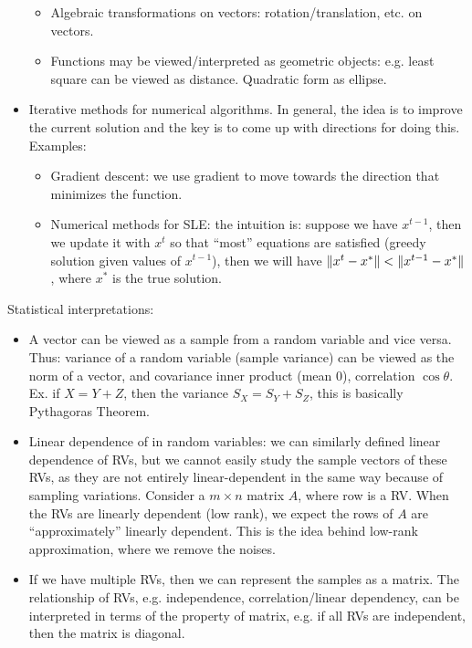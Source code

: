 \documentclass{report}
\begin{document}
\begin{itemize}
\begin{itemize}
		\item Algebraic transformations on vectors: rotation/translation, etc. on vectors. 
		
		\item Functions may be viewed/interpreted as geometric objects: e.g. least square can be viewed as distance. Quadratic form as ellipse.  
	\end{itemize} 
	
	\item Iterative methods for numerical algorithms. In general, the idea is to improve the current solution and the key is to come up with directions for doing this. Examples: 
	\begin{itemize}
		\item Gradient descent: we use gradient to move towards the direction that minimizes the function. 
		\item Numerical methods for SLE: the intuition is: suppose we have $x^{t-1}$, then we update it with $x^{t}$ so that ``most'' equations are satisfied (greedy solution given values of $x^{t-1}$), then we will have $\lVert x^{t} - x^*\rVert < \lVert x^{t-1} - x^*\rVert$, where $x^*$ is the true solution. 
	\end{itemize}
\end{itemize}

Statistical interpretations: 
\begin{itemize}
	\item A vector can be viewed as a sample from a random variable and vice versa. Thus: variance of a random variable (sample variance) can be viewed as the norm of a vector, and covariance inner product (mean 0), correlation $\cos \theta$. Ex. if $X = Y + Z$, then the variance $S_X = S_Y + S_Z$, this is basically Pythagoras Theorem. 
	
	\item Linear dependence of in random variables: we can similarly defined linear dependence of RVs, but we cannot easily study the sample vectors of these RVs, as they are not entirely linear-dependent in the same way because of sampling variations. Consider a $m \times n$ matrix $A$, where row is a RV. When the RVs are linearly dependent (low rank), we expect the rows of $A$ are ``approximately'' linearly dependent. This is the idea behind low-rank approximation, where we remove the noises.
	
	\item If we have multiple RVs, then we can represent the samples as a matrix. The relationship of RVs, e.g. independence, correlation/linear dependency, can be interpreted in terms of the property of matrix, e.g. if all RVs are independent, then the matrix is diagonal.   
\end{itemize}
\end{document}
